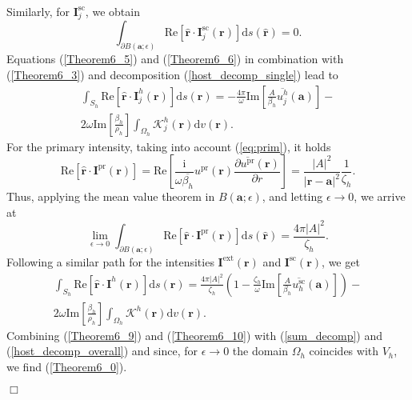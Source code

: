 \documentclass{article}
\begin{document}
%
Similarly, for $\mathbf{I}_j^{\mathrm{sc}}$, we obtain
%
\begin{equation}
\label{Theorem6_6}
\int_{\partial B(\mathbf{a};\epsilon)}\mathrm{Re}\left[\hat{\mathbf{r}}\cdot\mathbf{I}_j^{\mathrm{sc}}(\mathbf{r})\right]\mathrm{d}s(\hat{\mathbf{r}})=0.
\end{equation}
%
Equations (\ref{Theorem6_5}) and (\ref{Theorem6_6}) in combination with (\ref{Theorem6_3}) and decomposition (\ref{host_decomp_single}) lead to
%
\begin{align}
\nonumber
\int_{S_h}\mathrm{Re}\left[\hat{\mathbf{r}}\cdot\mathbf{I}_j^h(\mathbf{r})\right]\mathrm{d}s(\mathbf{r})=-\frac{4\pi}{\omega}\mathrm{Im}\left[\frac{A}{\beta_h}\overline{u_j^{h}}(\mathbf{a})\right]-\\2\omega\mathrm{Im}\left[\frac{\beta_h}{\rho_h}\right]\int_{\Omega_h}\mathcal{K}_j^h(\mathbf{r})\mathrm{d}v(\mathbf{r}).\label{Theorem6_7}
\end{align}
%
For the primary intensity, taking into account (\ref{eq:prim}), it holds
\begin{equation}
\label{Theorem6_8}\mathrm{Re}\left[\hat{\mathbf{r}}\cdot\mathbf{I}^{\mathrm{pr}}(\mathbf{r})\right]=\mathrm{Re}\left[\frac{\mathrm{i}}{\omega\overline{\beta_h}}u^{\mathrm{pr}}(\mathbf{r})\frac{\partial\overline{u^{\mathrm{pr}}}(\mathbf{r})}{\partial r}\right]=\frac{\lvert A\rvert^2}{\lvert\mathbf{r}-\mathbf{a}\rvert^2}\frac{1}{\zeta_h}.
\end{equation}
%
Thus, applying the mean value theorem in $B(\mathbf{a};\epsilon)$, and letting $\epsilon\rightarrow0$, we arrive at
%
\begin{equation}
\label{Theorem6_9}
\lim_{\epsilon\rightarrow0}\int_{\partial B(\mathbf{a};\epsilon)}\mathrm{Re}\left[\hat{\mathbf{r}}\cdot\mathbf{I}^{\mathrm{pr}}(\mathbf{r})\right]\mathrm{d}s(\hat{\mathbf{r}})=\frac{4\pi\lvert A\rvert^2}{\zeta_h}.
\end{equation}
%
Following a similar path for the intensities $\mathbf{I}^{\mathrm{ext}}(\mathbf{r})$ and $\mathbf{I}^{\mathrm{sc}}(\mathbf{r})$, we get
%
\begin{align}
        \nonumber
        \int_{S_h}\mathrm{Re}\left[\hat{\mathbf{r}}\cdot\mathbf{I}^h(\mathbf{r})\right]\mathrm{d}s(\mathbf{r})=\frac{4\pi\lvert A\rvert^2}{\zeta_h}\left(1-\frac{\zeta_h}{\omega}\mathrm{Im}\left[\frac{A}{\beta_h}\overline{u_h^{\mathrm{sc}}}(\mathbf{a})\right]\right)-\\2\omega\mathrm{Im}\left[\frac{\beta_h}{\rho_h}\right]\int_{\Omega_h}\mathcal{K}^h(\mathbf{r})\mathrm{d}v(\mathbf{r}).\label{Theorem6_10}
    \end{align}
%
Combining (\ref{Theorem6_9}) and (\ref{Theorem6_10}) with (\ref{sum_decomp}) and (\ref{host_decomp_overall}) and since, for $\epsilon\rightarrow0$ the domain $\Omega_h$ coincides with $V_h$, we find (\ref{Theorem6_0}).
%
 \begin{flushright}$\Box$\end{flushright}
\end{document}
